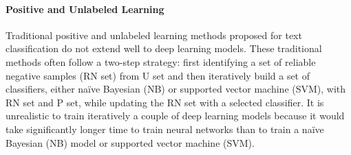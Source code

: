 


\paragraph{Positive and Unlabeled Learning}

Traditional positive and unlabeled learning methods proposed for text classification\cite{liu2003building} do not extend well to deep learning models.
These traditional methods often follow a two-step strategy: first identifying a set of reliable negative samples (RN set) from U set and then iteratively build a set of classifiers, either na\"ive Bayesian (NB) or supported vector machine (SVM), with RN set and P set, while updating the RN set with a selected classifier.
It is unrealistic to train iteratively a couple of deep learning models because it would take significantly longer time to train neural networks than to train a na\"ive Bayesian (NB) model or supported vector machine (SVM).

